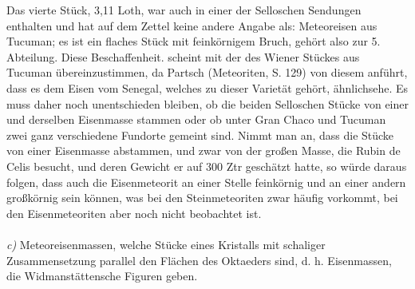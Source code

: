 \documentclass[a4paper, 11pt, oneside]{article}
\begin{document}
Das vierte Stück, 3,11 Loth, war auch in einer der Selloschen Sendungen enthalten und hat auf dem Zettel keine andere Angabe als: Meteoreisen aus Tucuman; es ist ein flaches Stück mit feinkörnigem Bruch, gehört also zur 5. Abteilung. Diese Beschaffenheit. scheint mit der des Wiener Stückes aus Tucuman übereinzustimmen, da Partsch (Meteoriten, S. 129) von diesem anführt, dass es dem Eisen vom Senegal, welches zu dieser Varietät gehört, ähnlichsehe. Es muss daher noch unentschieden bleiben, ob die beiden Selloschen Stücke von einer und derselben Eisenmasse stammen oder ob unter Gran Chaco und Tucuman zwei ganz verschiedene Fundorte gemeint sind. Nimmt man an, dass die Stücke von einer Eisenmasse abstammen, und zwar von der großen Masse, die Rubin de Celis besucht, und deren Gewicht er auf 300 Ztr geschätzt hatte, so würde daraus folgen, dass auch die Eisenmeteorit an einer Stelle feinkörnig und an einer andern großkörnig sein können, was bei den Steinmeteoriten zwar häufig vorkommt, bei den Eisenmeteoriten aber noch nicht beobachtet ist.
\vspace{\medskipamount}
\paragraph{}
\emph{c)} Meteoreisenmassen, welche Stücke eines Kristalls mit schaliger Zusammensetzung parallel den Flächen des Oktaeders sind, d. h. Eisenmassen, die Widmanstättensche Figuren geben.
\vspace{\medskipamount}
\end{document}

